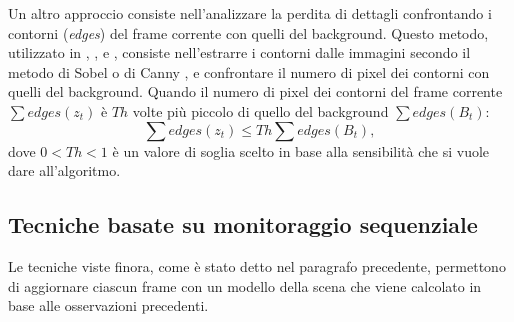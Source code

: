 Un altro approccio consiste nell'analizzare la perdita di dettagli confrontando i contorni (\textit{edges}) del frame corrente con quelli del background.
Questo metodo, utilizzato in \cite{ellwart2012camera}, \cite{gil2007automatic}, \cite{harasse2004automated} e \cite{kryjak2012fpga}, consiste nell'estrarre i contorni dalle immagini secondo il metodo di Sobel \cite{sobel19683x3} o di Canny \cite{canny1986computational}, e confrontare il numero di pixel dei contorni con quelli del background. 
Quando il numero di pixel dei contorni del frame corrente $\sum edges(z_t)$ \`e $Th$ volte pi\`u piccolo di quello del background $\sum edges(B_t)$:
\[ \sum edges(z_t) \leq Th \sum edges(B_t), \]
dove $0<Th<1$ \`e  un valore di soglia scelto in base alla sensibilit\`a che si vuole dare all'algoritmo.
\subsection{Tecniche basate su monitoraggio sequenziale}
Le tecniche viste finora, come \`e stato detto nel paragrafo precedente, permettono di aggiornare ciascun frame con un modello della scena che viene calcolato in base alle osservazioni precedenti.
